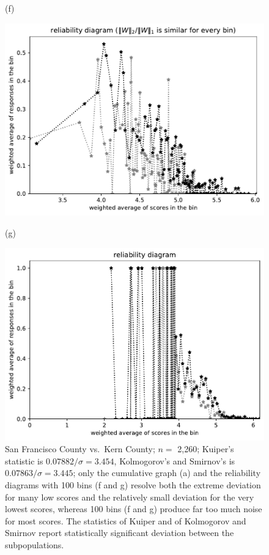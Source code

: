 \documentclass{article}
\newlength{\imsize}
\begin{document}
\begin{figure}
\begin{centering}
(f)
\parbox{\imsize}{\includegraphics[width=\imsize]
{../codes/weighted/County_of_San_Francisco_vs_Kern-LNGI/equierrs100.pdf}}
\quad\quad
(g)
\parbox{\imsize}{\includegraphics[width=\imsize]
{../codes/weighted/County_of_San_Francisco_vs_Kern-LNGI/equiscores100.pdf}}

\end{centering}
\caption{San Francisco County vs.\ Kern County; $n =$ 2,260;
         Kuiper's statistic is $0.07882 / \sigma = 3.454$,
         Kolmogorov's and Smirnov's is $0.07863 / \sigma = 3.445$;
         only the cumulative graph (a) and the reliability diagrams
         with 100 bins (f and g) resolve both the extreme deviation
         for many low scores and the relatively small deviation
         for the very lowest scores, whereas 100 bins (f and g) produce
         far too much noise for most scores.
         The statistics of Kuiper and of Kolmogorov and Smirnov report
         statistically significant deviation between the subpopulations.
}
\label{San_Francisco-Kern}
\end{figure}
\end{document}
